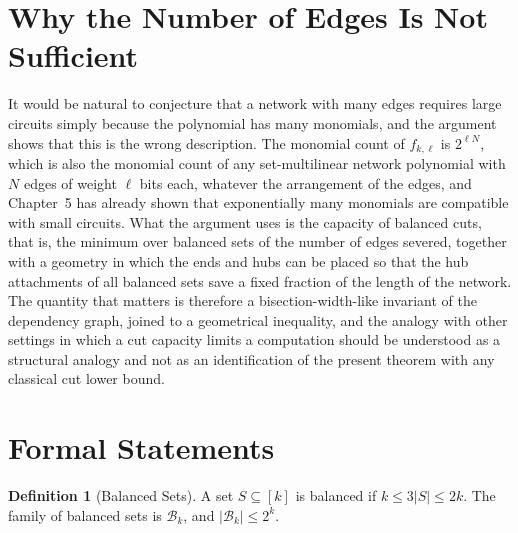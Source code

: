 \documentclass[11pt,letterpaper]{report}
\theoremstyle{plain}
\theoremstyle{definition}
\newtheorem{definition}[theorem]{Definition}
\theoremstyle{remark}
\begin{document}
\section{Why the Number of Edges Is Not Sufficient}

It would be natural to conjecture that a network with many edges requires large circuits simply because the polynomial has many monomials, and the argument shows that this is the wrong description. The monomial count of $f_{k,\ell}$ is $2^{\ell N}$, which is also the monomial count of any set-multilinear network polynomial with $N$ edges of weight $\ell$ bits each, whatever the arrangement of the edges, and Chapter~5 has already shown that exponentially many monomials are compatible with small circuits. What the argument uses is the capacity of balanced cuts, that is, the minimum over balanced sets of the number of edges severed, together with a geometry in which the ends and hubs can be placed so that the hub attachments of all balanced sets save a fixed fraction of the length of the network. The quantity that matters is therefore a bisection-width-like invariant of the dependency graph, joined to a geometrical inequality, and the analogy with other settings in which a cut capacity limits a computation should be understood as a structural analogy and not as an identification of the present theorem with any classical cut lower bound.

\section{Formal Statements}

\begin{definition}[Balanced Sets]
A set $S\subseteq[k]$ is balanced if $k\le3|S|\le2k$. The family of balanced sets is $\mathcal B_k$, and $|\mathcal B_k|\le2^k$.
\end{definition}
\end{document}
